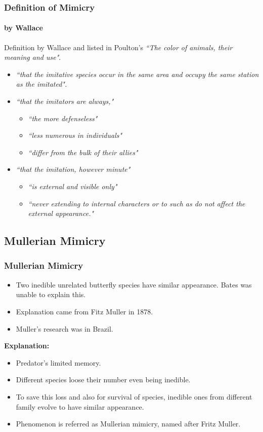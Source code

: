 \frame
{
	\frametitle{Definition of Mimicry}
	\framesubtitle{by Wallace}
	
	Definition by Wallace and listed in Poulton's \textit{``The color of animals, their meaning and use"}.
		\begin{itemize}
			\item \textsl{``that the imitative species occur in the same area and occupy the same station as the imitated".}
			\item \textsl{``that the imitators are always,"}
				\begin{itemize}
					\item \textsl{``the more defenseless"}
					\item \textsl{``less numerous in individuals"}
					\item \textsl{``differ from the bulk of their allies"}
				\end{itemize}
			\item \textsl{``that the imitation, however minute"}
				\begin{itemize}
					\item \textsl{``is external and visible only"}
					\item \textsl{``never extending to internal characters or to such as do not affect the external appearance."}
				\end{itemize}
		\end{itemize}
}

\subsection{Mullerian Mimicry}

\frame
{
	\frametitle{Mullerian Mimicry}
	
	\begin{itemize}
		\item Two inedible unrelated butterfly species have similar appearance. Bates was unable to explain this.
		\item Explanation came from Fitz Muller in 1878.
		\item Muller's research was in Brazil.
	\end{itemize}

\textbf{Explanation:}
	\begin{itemize}
		\item Predator's limited memory.
		\item Different species loose their number even being inedible.
		\item To save this loss and also for survival of species, inedible ones from different family evolve to have similar appearance.
		\item Phenomenon is referred as Mullerian mimicry, named after Fritz Muller.
	\end{itemize}
}

